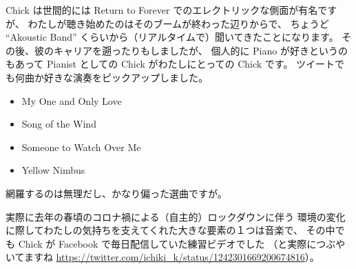\documentclass[dvipdfmx,autodetect-engine,10pt,b5paper,papersize,openany,dvipsnames]{jsbook}
\begin{document}
\begin{multicols}{2}
Chick は世間的には Return to Forever でのエレクトリックな側面が有名ですが、
わたしが聴き始めたのはそのブームが終わった辺りからで、
ちょうど ``Akoustic Band'' くらいから（リアルタイムで）聞いてきたことになります。
その後、彼のキャリアを遡ったりもしましたが、
個人的に Piano が好きというのもあって
Pianist としての Chick がわたしにとっての Chick です。
ツイートでも何曲か好きな演奏をピックアップしました。
\begin{itemize}
\item My One and Only Love
\item Song of the Wind
\item Someone to Watch Over Me
\item Yellow Nimbus
\end{itemize}
網羅するのは無理だし、かなり偏った選曲ですが。


\vspace{10cm}


実際に去年の春頃のコロナ禍による（自主的）ロックダウンに伴う
環境の変化に際してわたしの気持ちを支えてくれた大きな要素の１つは音楽で、
その中でも Chick が Facebook で毎日配信していた練習ビデオでした
（と実際につぶやいてますね
\url{https://twitter.com/ichiki_k/status/1242301669200674816}）。


\end{multicols}
\end{document}
